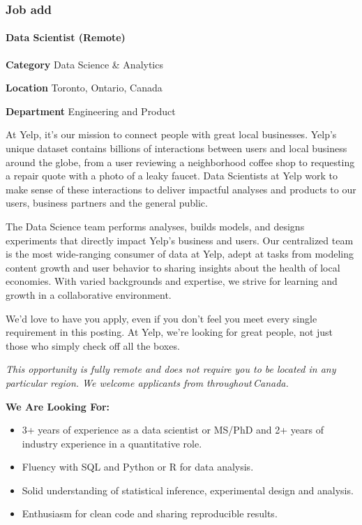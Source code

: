 \documentclass[
  openany]{book}
\begin{document}
\hypertarget{job-add}{%
\subsubsection{Job add}\label{job-add}}

\hypertarget{data-scientist-remote}{%
\paragraph{Data Scientist (Remote)}\label{data-scientist-remote}}

\textbf{Category} Data Science \& Analytics

\textbf{Location} Toronto, Ontario, Canada

\textbf{Department} Engineering and Product

At Yelp, it's our mission to connect people with great local businesses. Yelp's unique dataset contains billions of interactions between users and local business around the globe, from a user reviewing a neighborhood coffee shop to requesting a repair quote with a photo of a leaky faucet. Data Scientists at Yelp work to make sense of these interactions to deliver impactful analyses and products to our users, business partners and the general public.

The Data Science team performs analyses, builds models, and designs experiments that directly impact Yelp's business and users. Our centralized team is the most wide-ranging consumer of data at Yelp, adept at tasks from modeling content growth and user behavior to sharing insights about the health of local economies. With varied backgrounds and expertise, we strive for learning and growth in a collaborative environment.

We'd love to have you apply, even if you don't feel you meet every single requirement in this posting. At Yelp, we're looking for great people, not just those who simply check off all the boxes.

\emph{This opportunity is fully remote and does not require you to be located in any particular region. We welcome applicants from throughout\,Canada.}

\textbf{We Are Looking For:}

\begin{itemize}
\item
  3+ years of experience as a data scientist or MS/PhD and 2+ years of industry experience in a quantitative role.
\item
  Fluency with SQL and Python or R for data analysis.
\item
  Solid understanding of statistical inference, experimental design and analysis.
\item
  Enthusiasm for clean code and sharing reproducible results.
\end{itemize}
\end{document}
